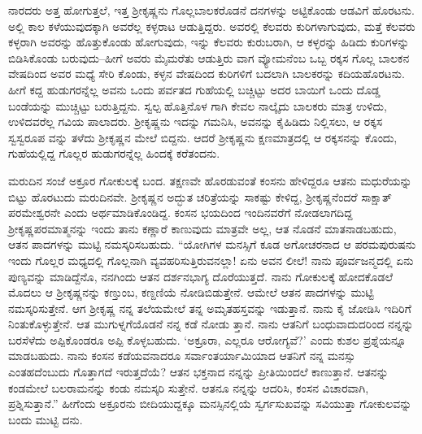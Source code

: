 ನಾರದರು ಅತ್ತ ಹೋಗುತ್ತಲೆ, ಇತ್ತ ಶ್ರೀಕೃಷ್ಣನು ಗೊಲ್ಲಬಾಲಕರೊಡನೆ ದನಗಳನ್ನು ಅಟ್ಟಿಕೊಂಡು ಆಡವಿಗೆ ಹೊರಟನು. ಅಲ್ಲಿ ಕಾಲ ಕಳೆಯುವುದಕ್ಕಾಗಿ ಅವರೆಲ್ಲ ಕಳ್ಳರಾಟ ಆಡುತ್ತಿದ್ದರು. ಅವರಲ್ಲಿ ಕೆಲವರು ಕುರಿಗಳಾಗುವುದು, ಮತ್ತೆ ಕೆಲವರು ಕಳ್ಳರಾಗಿ ಅವರನ್ನು ಹೊತ್ತುಕೊಂಡು ಹೋಗುವುದು, ಇನ್ನು ಕೆಲವರು ಕುರುಬರಾಗಿ, ಆ ಕಳ್ಳರನ್ನು ಹಿಡಿದು ಕುರಿಗಳನ್ನು ಬಿಡಿಸಿಕೊಂಡು ಬರುವುದು–ಹೀಗೆ ಅವರು ಮೈಮರೆತು ಆಡುತ್ತಿರು ವಾಗ ವ್ಯೋಮನೆಂಬ ಒಬ್ಬ ರಕ್ಕಸ ಗೊಲ್ಲ ಬಾಲಕನ ವೇಷದಿಂದ ಅವರ ಮಧ್ಯೆ ಸೇರಿ ಕೊಂಡು, ಕಳ್ಳನ ವೇಷದಿಂದ ಕುರಿಗಳಿಗೆ ಬದಲಾಗಿ ಬಾಲಕರನ್ನು ಕದಿಯಹೊರಟನು. ಹೀಗೆ ಕದ್ದ ಹುಡುಗರನ್ನೆಲ್ಲ ಅವನು ಒಂದು ಪರ್ವತದ ಗುಹೆಯಲ್ಲಿ ಬಚ್ಚಿಟ್ಟು ಅದರ ಬಾಯಿಗೆ ಒಂದು ದೊಡ್ಡ ಬಂಡೆಯನ್ನು ಮುಚ್ಚಿಟ್ಟು ಬರುತ್ತಿದ್ದನು. ಸ್ವಲ್ಪ ಹೊತ್ತಿನೊಳ ಗಾಗಿ ಕೇವಲ ನಾಲ್ಕೈದು ಬಾಲಕರು ಮಾತ್ರ ಉಳಿದು, ಉಳಿದವರೆಲ್ಲ ಗವಿಯ ಪಾಲಾದರು. ಶ್ರೀಕೃಷ್ಣನು ಇದನ್ನು ಗಮನಿಸಿ, ಅವನನ್ನು ಕೈಹಿಡಿದು ನಿಲ್ಲಿಸಲು, ಆ ರಕ್ಕಸ ಸ್ವಸ್ವರೂಪ ವನ್ನು ತಳೆದು ಶ್ರೀಕೃಷ್ಣನ ಮೇಲೆ ಬಿದ್ದನು. ಆದರೆ ಶ್ರೀಕೃಷ್ಣನು ಕ್ಷಣಮಾತ್ರದಲ್ಲಿ ಆ ರಕ್ಕಸನನ್ನು ಕೊಂದು, ಗುಹೆಯಲ್ಲಿದ್ದ ಗೊಲ್ಲರ ಹುಡುಗರನ್ನೆಲ್ಲ ಹಿಂದಕ್ಕೆ ಕರೆತಂದನು.

ಮರುದಿನ ಸಂಜೆ ಅಕ್ರೂರ ಗೋಕುಲಕ್ಕೆ ಬಂದ. ತಕ್ಷಣವೇ ಹೊರಡುವಂತೆ ಕಂಸನು ಹೇಳಿದ್ದರೂ ಆತನು ಮಧುರೆಯನ್ನು ಬಿಟ್ಟು ಹೊರಟುದು ಮರುದಿನವೇ. ಶ್ರೀಕೃಷ್ಣನ ಅದ್ಭುತ ಚರಿತ್ರೆಯನ್ನು ಸಾಕಷ್ಟು ಕೇಳಿದ್ದ, ಶ್ರೀಕೃಷ್ಣನೆಂದರೆ ಸಾಕ್ಷಾತ್​ಪರಮೇಶ್ವರನೇ ಎಂದು ಅರ್ಥಮಾಡಿಕೊಂಡಿದ್ದ. ಕಂಸನ ಭಯದಿಂದ ಇಂದಿನವರೆಗೆ ನೋಡಲಾಗದಿದ್ದ ಶ್ರೀಕೃಷ್ಣಪರಮಾತ್ಮನನ್ನು ಇಂದು ತಾನು ಕಣ್ಣಾರೆ ಕಾಣುವುದು ಮಾತ್ರವೇ ಅಲ್ಲ, ಆತ ನೊಡನೆ ಮಾತನಾಡಬಹುದು, ಆತನ ಪಾದಗಳನ್ನು ಮುಟ್ಟಿ ನಮಸ್ಕರಿಸಬಹುದು. “ಯೋಗಿಗಳ ಮನಸ್ಸಿಗೆ ಕೂಡ ಅಗೋಚರನಾದ ಆ ಪರಮಪುರುಷನು ಇಂದು ಗೊಲ್ಲರ ಮಧ್ಯದಲ್ಲಿ ಗೊಲ್ಲನಾಗಿ ವ್ಯವಹರಿಸುತ್ತಿರುವನಲ್ಲಾ! ಏನು ಅವನ ಲೀಲೆ! ನಾನು ಪೂರ್ವಜನ್ಮದಲ್ಲಿ ಏನು ಪುಣ್ಯವನ್ನು ಮಾಡಿದ್ದೆನೊ, ನನಗಿಂದು ಆತನ ದರ್ಶನಭಾಗ್ಯ ದೊರೆಯುತ್ತದೆ. ನಾನು ಗೋಕುಲಕ್ಕೆ ಹೋದಕೊಡಲೆ ಮೊದಲು ಆ ಶ್ರೀಕೃಷ್ಣನನ್ನು ಕಣ್ತುಂಬ, ಕಣ್ದಣಿಯೆ ನೋಡಿಬಿಡುತ್ತೇನೆ. ಆಮೇಲೆ ಆತನ ಪಾದಗಳನ್ನು ಮುಟ್ಟಿ ನಮಸ್ಕರಿಸುತ್ತೇನೆ. ಆಗ ಶ್ರೀಕೃಷ್ಣ ನನ್ನ ತಲೆಯಮೇಲೆ ತನ್ನ ಅಮೃತಹಸ್ತವನ್ನು ಇಡುತ್ತಾನೆ. ನಾನು ಕೈ ಜೋಡಿಸಿ ಇದಿರಿಗೆ ನಿಂತುಕೊಳ್ಳುತ್ತೇನೆ. ಆತ ಮುಗುಳ್ನಗೆಯೊಡನೆ ನನ್ನ ಕಡೆ ನೋಡು ತ್ತಾನೆ. ನಾನು ಆತನಿಗೆ ಬಂಧುವಾದುದರಿಂದ ನನ್ನನ್ನು ಬರಸೆಳೆದು ಅಪ್ಪಿಕೊಂಡರೂ ಅಪ್ಪಿ ಕೊಳ್ಳಬಹುದು. ‘ಅಕ್ರೂರಾ, ಎಲ್ಲರೂ ಆರೋಗ್ಯವೆ?’ ಎಂದು ಕುಶಲ ಪ್ರಶ್ನೆಯನ್ನೂ ಮಾಡಬಹುದು. ನಾನು ಕಂಸನ ಕಡೆಯವನಾದರೂ ಸರ್ವಾಂತರ್ಯಾಮಿಯಾದ ಆತನಿಗೆ ನನ್ನ ಮನಸ್ಸು ಎಂತಹದೆಂಬುದು ಗೊತ್ತಾಗದೆ ಇರುತ್ತದೆಯೆ? ಆತನ ಭಕ್ತನಾದ ನನ್ನನ್ನು ಪ್ರೀತಿಯಿಂದಲೆ ಕಾಣುತ್ತಾನೆ. ಆತನನ್ನು ಕಂಡಮೇಲೆ ಬಲರಾಮನನ್ನು ಕಂಡು ನಮಸ್ಕರಿ ಸುತ್ತೇನೆ. ಆತನೂ ನನ್ನನ್ನು ಆದರಿಸಿ, ಕಂಸನ ವಿಚಾರವಾಗಿ, ಪ್ರಶ್ನಿಸುತ್ತಾನೆ.” ಹೀಗೆಂದು ಅಕ್ರೂರನು ಬೀದಿಯುದ್ದಕ್ಕೂ ಮನಸ್ಸಿನಲ್ಲಿಯೆ ಸ್ವರ್ಗಸುಖವನ್ನು ಸವಿಯುತ್ತಾ ಗೋಕುಲವನ್ನು ಬಂದು ಮುಟ್ಟಿ ದನು.

